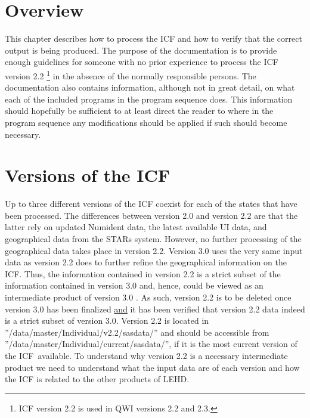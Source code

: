                       

%
%


\section{Overview}
\label{sec:icf_technical_overview}


This chapter describes how to process the ICF and how to verify that the
correct output is being produced. The purpose of the documentation is to
provide enough guidelines for someone with no prior experience to process
the ICF version 2.2%
%
\footnote{ICF version 2.2 is used in QWI versions 2.2 and 2.3.}
%
 in the absence of the normally responsible persons. The
documentation also contains information, although not in great detail, on
what each of the included programs in the program sequence does. This
information should hopefully be sufficient to at least direct the reader to
where in the program sequence any modifications should be applied if such
should become necessary.

\section{Versions of the ICF}

Up to three different versions of the ICF coexist for each of the states
that have been processed. The differences between version 2.0 and version
2.2 are that the latter rely on updated Numident data, the latest available
UI data, and geographical data from the STARs system. However, no further
processing of the geographical data takes place in version 2.2. Version 3.0
uses the very same input data as version 2.2 does to further refine the
geographical information on the ICF. Thus, the information contained in
version 2.2 is a strict subset of the information contained in version 3.0
and, hence, could be viewed as an intermediate product of version 3.0 . As
such, version 2.2 is to be deleted once version 3.0 has been finalized 
\underline{and} it has been verified that version 2.2 data indeed is a
strict subset of version 3.0. Version 2.2 is located in
''/data/master/Individual/v2.2/sasdata/'' and should be accessible from
''/data/master/Individual/current/sasdata/'', if it is the most current
version of the ICF\ available. To understand why version 2.2 is a necessary
intermediate product we need to understand what the input data are of each
version and how the ICF is related to the other products of LEHD.

